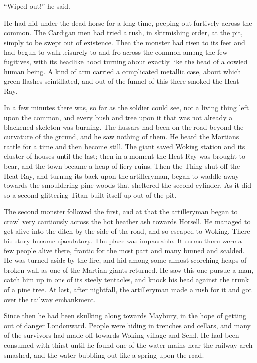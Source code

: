 ``Wiped out!'' he said.

He had hid under the dead horse for a long time, peeping out
furtively across the common. The Cardigan men had tried a rush, in
skirmishing order, at the pit, simply to be swept out of existence.
Then the monster had risen to its feet and had begun to walk
leisurely to and fro across the common among the few fugitives,
with its headlike hood turning about exactly like the head of a
cowled human being. A kind of arm carried a complicated metallic
case, about which green flashes scintillated, and out of the funnel
of this there smoked the Heat-Ray.

In a few minutes there was, so far as the soldier could see, not a
living thing left upon the common, and every bush and tree upon it
that was not already a blackened skeleton was burning. The hussars
had been on the road beyond the curvature of the ground, and he saw
nothing of them. He heard the Martians rattle for a time and then
become still. The giant saved Woking station and its cluster of
houses until the last; then in a moment the Heat-Ray was brought to
bear, and the town became a heap of fiery ruins. Then the Thing
shut off the Heat-Ray, and turning its back upon the artilleryman,
began to waddle away towards the smouldering pine woods that
sheltered the second cylinder. As it did so a second glittering
Titan built itself up out of the pit.

The second monster followed the first, and at that the artilleryman
began to crawl very cautiously across the hot heather ash towards
Horsell. He managed to get alive into the ditch by the side of the
road, and so escaped to Woking. There his story became ejaculatory.
The place was impassable. It seems there were a few people alive
there, frantic for the most part and many burned and scalded. He
was turned aside by the fire, and hid among some almost scorching
heaps of broken wall as one of the Martian giants returned. He saw
this one pursue a man, catch him up in one of its steely tentacles,
and knock his head against the trunk of a pine tree. At last, after
nightfall, the artilleryman made a rush for it and got over the
railway embankment.

Since then he had been skulking along towards Maybury, in the hope
of getting out of danger Londonward. People were hiding in trenches
and cellars, and many of the survivors had made off towards Woking
village and Send. He had been consumed with thirst until he found
one of the water mains near the railway arch smashed, and the water
bubbling out like a spring upon the road.

